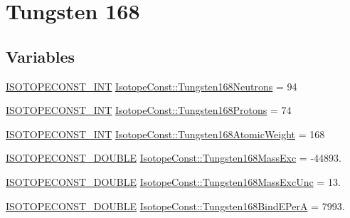 \hypertarget{group___isotope_const-_tungsten-_w168}{}\section{Tungsten 168}
\label{group___isotope_const-_tungsten-_w168}
\subsection*{Variables}
\begin{DoxyCompactItemize}
\item 
\mbox{\hyperlink{group___isotope_const-_macros_ga5f18360b3e99483a35c32d789e62621c}{I\+S\+O\+T\+O\+P\+E\+C\+O\+N\+S\+T\+\_\+\+I\+NT}} \mbox{\hyperlink{group___isotope_const-_tungsten-_w168_ga51b192e5a33898025f3cd1e47bf5ec7d}{Isotope\+Const\+::\+Tungsten168\+Neutrons}} = 94
\item 
\mbox{\hyperlink{group___isotope_const-_macros_ga5f18360b3e99483a35c32d789e62621c}{I\+S\+O\+T\+O\+P\+E\+C\+O\+N\+S\+T\+\_\+\+I\+NT}} \mbox{\hyperlink{group___isotope_const-_tungsten-_w168_ga31621d9ba60e0d494798c278bb1f2da0}{Isotope\+Const\+::\+Tungsten168\+Protons}} = 74
\item 
\mbox{\hyperlink{group___isotope_const-_macros_ga5f18360b3e99483a35c32d789e62621c}{I\+S\+O\+T\+O\+P\+E\+C\+O\+N\+S\+T\+\_\+\+I\+NT}} \mbox{\hyperlink{group___isotope_const-_tungsten-_w168_ga196eb41250b06e6edfee24317258c612}{Isotope\+Const\+::\+Tungsten168\+Atomic\+Weight}} = 168
\item 
\mbox{\hyperlink{group___isotope_const-_macros_ga8f45a7272ce02c0b4c65c44636ed719a}{I\+S\+O\+T\+O\+P\+E\+C\+O\+N\+S\+T\+\_\+\+D\+O\+U\+B\+LE}} \mbox{\hyperlink{group___isotope_const-_tungsten-_w168_ga9f58b04ec72898d05c004d360ab0f7d4}{Isotope\+Const\+::\+Tungsten168\+Mass\+Exc}} = -\/44893.
\item 
\mbox{\hyperlink{group___isotope_const-_macros_ga8f45a7272ce02c0b4c65c44636ed719a}{I\+S\+O\+T\+O\+P\+E\+C\+O\+N\+S\+T\+\_\+\+D\+O\+U\+B\+LE}} \mbox{\hyperlink{group___isotope_const-_tungsten-_w168_gacffc18d212a93e5b9f88748058dc67c6}{Isotope\+Const\+::\+Tungsten168\+Mass\+Exc\+Unc}} = 13.
\item 
\mbox{\hyperlink{group___isotope_const-_macros_ga8f45a7272ce02c0b4c65c44636ed719a}{I\+S\+O\+T\+O\+P\+E\+C\+O\+N\+S\+T\+\_\+\+D\+O\+U\+B\+LE}} \mbox{\hyperlink{group___isotope_const-_tungsten-_w168_ga6fb6b39c64f3de38c6463f01b9cafaa5}{Isotope\+Const\+::\+Tungsten168\+Bind\+E\+PerA}} = 7993.
\item 

\end{DoxyCompactItemize}
